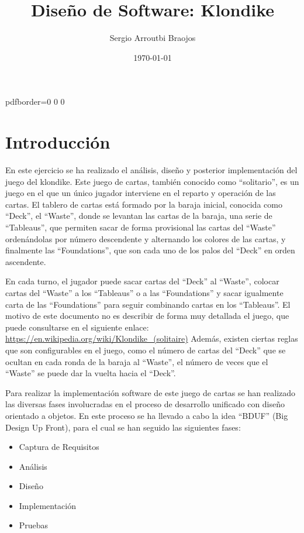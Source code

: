 \documentclass[11pt]{article}
\title{\textbf{Diseño de Software: Klondike}}
\author{Sergio Arroutbi Braojos}
\date{\today}
\begin{document}
\hypersetup
{   
pdfborder={0 0 0}
}
   
\maketitle

\pagebreak

\tableofcontents

\pagebreak

\section{Introducción}
En este ejercicio se ha realizado el análisis, diseño y posterior implementación del juego del klondike. Este juego de cartas, también conocido como ``solitario'', es un juego en el que un único jugador interviene en el reparto y operación de las cartas. El tablero de cartas está formado por la baraja inicial, conocida como ``Deck'', el ``Waste'', donde se levantan las cartas de la baraja, una serie de ``Tableaus'', que permiten sacar de forma provisional las cartas del ``Waste'' ordenándolas por número descendente y alternando los colores de las cartas, y finalmente las ``Foundations'', que son cada uno de los palos del ``Deck'' en orden ascendente.

En cada turno, el jugador puede sacar cartas del ``Deck'' al ``Waste'', colocar cartas del ``Waste'' a los ``Tableaus'' o a las ``Foundations'' y sacar igualmente carta de las ``Foundations'' para seguir combinando cartas en los ``Tableaus''.
El motivo de este documento no es describir de forma muy detallada el juego, que puede consultarse en el siguiente enlace: \url{https://en.wikipedia.org/wiki/Klondike_(solitaire)}
Además, existen ciertas reglas que son configurables en el juego, como el número de cartas del ``Deck'' que se ocultan en cada ronda de la baraja al ``Waste'', el número de veces que el ``Waste'' se puede dar la vuelta hacia el ``Deck''.

Para realizar la implementación software de este juego de cartas se han realizado las diversas fases involucradas en el proceso de desarrollo unificado con diseño orientado a objetos. En este proceso se ha llevado a cabo la idea ``BDUF'' (Big Design Up Front), para el cual se han seguido las siguientes fases:

\begin{itemize}\itemsep0pt
\item{Captura de Requisitos}
\item{Análisis}
\item{Diseño}
\item{Implementación}
\item{Pruebas}
\end{itemize}
\end{document}
